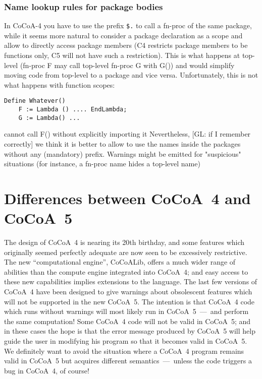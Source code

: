 \documentclass{book}[12,a4paper]
\begin{document}
\subsection{Name lookup rules for package bodies}

In CoCoA-4 you have to use the prefix \verb|$.| to call a fn-proc of
the same package, while it seems more natural to consider a package
declaration as a scope and allow to directly access package members
(C4 restricts package members to be functions only, C5 will not have
such a restriction).  This is what happens at top-level (fn-proc F may
call top-level fn-proc G with G()) and would simplify moving code from
top-level to a package and vice versa.
Unfortunately, this is not what happens with function scopes:
\begin{lstlisting}
Define Whatever()
    F := Lambda () .... EndLambda;
    G := Lambda() ...
\end{lstlisting}
cannot call F() without explicitly importing it
Nevertheless, [GL: if I remember correctly] we think it is better to 
allow to use the names inside the packages without any (mandatory) 
prefix. Warnings might be emitted for "suspicious" situations (for 
instance, a fn-proc name hides a top-level name)


\chapter{Differences between CoCoA~4 and CoCoA~5}
\label{diffs4-5}

The design of CoCoA~4 is nearing its 20th birthday, and some features which
originally seemed perfectly adequate are now seen to be excessively
restrictive.  The new ``computational engine'', CoCoALib, offers a much
wider range of abilities than the compute engine integrated into CoCoA~4;
and easy access to these new capabilities implies extensions to the language.
The last few versions of CoCoA~4 have been designed to give warnings about
obsolescent features which will not be supported in the new CoCoA~5.  The
intention is that CoCoA~4 code which runs without warnings will most likely
run in CoCoA~5~---~and perform the same computation!  Some CoCoA~4 code
will not be valid in CoCoA~5; and in these cases the hope is that the error
message produced by CoCoA~5 will help guide the user in modifying his
program so that it becomes valid in CoCoA~5.  We definitely want to avoid
the situation where a CoCoA~4 program remains valid in CoCoA~5 but acquires
different semantics~---~unless the code triggers a bug in CoCoA~4, of course!
\end{document}
